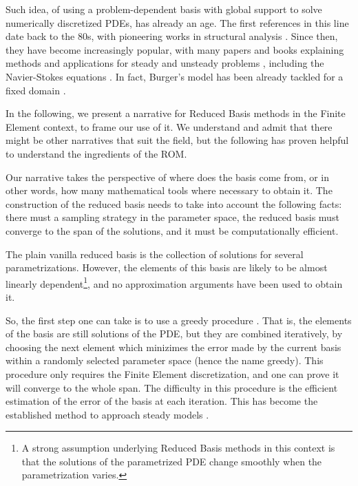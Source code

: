 \documentclass[literature_review.tex]{subfiles}
\begin{document}
Such idea, of using a problem-dependent basis with global support 
to solve numerically discretized PDEs,
has already an age.
The first references in this line date back to the 80s, 
with pioneering works in structural analysis \cite{1978firstRBStructuralAnalysis}.
Since then, they have become increasingly popular,
with many papers and books explaining methods and applications for steady and unsteady problems
\cite{Rozza2008, 
2005_aPosterioriErrorBoundsReducedBasisApproximationsParametrizedParabolicPde_Grepl,
2009_reducedBasisMethodsAPosterioriErrorEstimatorsHeatTransferProblems_Rozza,
2016_CertifiedReducedBasisMethodsParametrizedPDE_Hesthaven,
Quarteroni2016,
2017_modelReductionAndApproximation,
benner2017_book},
including the Navier-Stokes equations 
\cite{navierStokesReducedBasis}.
In fact, Burger's model has been already tackled for a fixed domain
\cite{Nguyen2009}.

In the following,
we present a narrative for Reduced Basis methods in the Finite Element context,
to frame our use of it.
We understand and admit that there might be other narratives that suit the field,
but the following has proven helpful to understand the ingredients of the ROM.

Our narrative takes the perspective of where does the basis come from,
or in other words,
how many mathematical tools where necessary to obtain it.
The construction of the reduced basis needs to take into account the following facts:
there must a sampling strategy in the parameter space,
the reduced basis must converge to the span of the solutions,
and it must be computationally efficient.

The plain vanilla reduced basis is the collection of solutions
for several parametrizations.
However, the elements of this basis are likely to be almost linearly dependent\footnote{
    A strong assumption underlying Reduced Basis methods in this context
    is that the solutions of the parametrized PDE
    change smoothly when the parametrization varies.
},
and no approximation arguments have been used to obtain it.

So, the first step one can take is to use a greedy procedure
\cite{Buffa2012APC, Veroy2003}.
That is, the elements of the basis are still solutions of the PDE, 
but they are combined iteratively,
by choosing the next element which minizimes 
the error made by the current basis within a randomly selected parameter space
(hence the name greedy).
This procedure only requires the Finite Element discretization,
and one can prove it will converge to the whole span.
The difficulty in this procedure 
is the efficient estimation of the error
of the basis at each iteration.
This has become the established method to approach steady models \cite{Haasdonk2013}.
\end{document}
